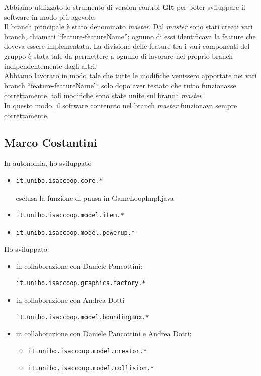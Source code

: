 \documentclass[a4paper,12pt]{report}
\begin{document}
Abbiamo utilizzato lo strumento di version control \textbf{Git} per poter sviluppare
il software in modo più agevole.
\\Il branch principale è stato denominato \textit{master}.
Dal \textit{master} sono stati creati vari branch, chiamati ``feature-featureName'';
ognuno di essi identificava la feature che doveva essere implementata.
La divisione delle feature tra i vari componenti del gruppo è stata tale da permettere
a ognuno di lavorare nel proprio branch indipendentemente dagli altri.
\\Abbiamo lavorato in modo tale che tutte le modifiche venissero apportate nei vari branch
``feature-featureName''; solo dopo aver testato che tutto funzionasse correttamente,
tali modifiche sono state unite sul branch \textit{master}.
\\In questo modo, il software contenuto nel branch \textit{master} funzionava sempre correttamente.


\subsection*{Marco Costantini}
In autonomia, ho sviluppato
\begin{itemize}
    \item \begin{verbatim}it.unibo.isaccoop.core.* \end{verbatim} esclusa la funzione di pausa in GameLoopImpl.java
    \item \begin{verbatim}it.unibo.isaccoop.model.item.* \end{verbatim}
    \item \begin{verbatim}it.unibo.isaccoop.model.powerup.* \end{verbatim}
\end{itemize}
Ho sviluppato:
\begin{itemize}
    \item in collaborazione con Daniele Pancottini: \begin{verbatim}it.unibo.isaccoop.graphics.factory.* \end{verbatim}
    \item in collaborazione con Andrea Dotti \begin{verbatim}it.unibo.isaccoop.model.boundingBox.* \end{verbatim}
    \item in collaborazione con Daniele Pancottini e Andrea Dotti:
    \begin{itemize}
        \item \begin{verbatim}it.unibo.isaccoop.model.creator.* \end{verbatim}
        \item \begin{verbatim}it.unibo.isaccoop.model.collision.* \end{verbatim}
    \end{itemize}
\end{itemize}
\end{document}
